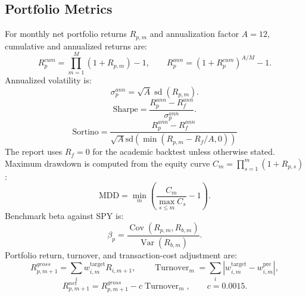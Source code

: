 \documentclass[11pt, a4paper]{article}
\begin{document}
\subsection{Portfolio Metrics}
For monthly net portfolio returns $R_{p,m}$ and annualization factor $A=12$, cumulative and annualized returns are:
\begin{equation}
R^{cum}_{p}=\prod_{m=1}^{M}(1+R_{p,m})-1,\qquad
R^{ann}_{p}=(1+R^{cum}_{p})^{A/M}-1.
\end{equation}
Annualized volatility is:
\begin{equation}
\sigma^{ann}_{p}=\sqrt{A}\operatorname{sd}(R_{p,m}).
\end{equation}
\begin{equation}
\text{Sharpe} = \frac{R_{p}^{ann}-R_{f}^{ann}}{\sigma_{p}^{ann}}.
\end{equation}
\begin{equation}
\text{Sortino} = \frac{R_{p}^{ann}-R_{f}^{ann}}{\sqrt{A}\text{sd}(\min(R_{p,m}-R_{f}/A,0))}
\end{equation}
The report uses $R_{f}=0$ for the academic backtest unless otherwise stated. Maximum drawdown is computed from the equity curve $C_{m}=\prod_{s=1}^{m}(1+R_{p,s})$:
\begin{equation}
\text{MDD} = \min_{m}\left(\frac{C_{m}}{\max_{s\le m}C_{s}}-1\right).
\end{equation}
Benchmark beta against SPY is:
\begin{equation}
\beta_p=\frac{\operatorname{Cov}(R_{p,m},R_{b,m})}{\operatorname{Var}(R_{b,m})}.
\end{equation}
Portfolio return, turnover, and transaction-cost adjustment are:
\begin{equation}
R^{gross}_{p,m+1}=\sum_i w^{\text{target}}_{i,m}R_{i,m+1},\qquad
\operatorname{Turnover}_{m}=\sum_i |w^{\text{target}}_{i,m}-w^{\text{pre}}_{i,m}|,
\end{equation}
\begin{equation}
R^{net}_{p,m+1}=R^{gross}_{p,m+1}-c\operatorname{Turnover}_{m},\qquad c=0.0015.
\end{equation}
\end{document}
